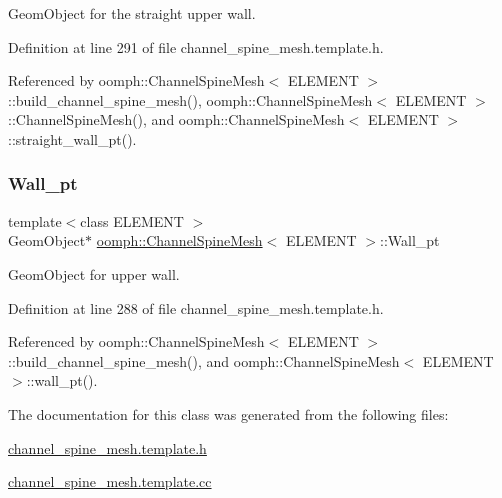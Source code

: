 Geom\+Object for the straight upper wall. 



Definition at line 291 of file channel\+\_\+spine\+\_\+mesh.\+template.\+h.



Referenced by oomph\+::\+Channel\+Spine\+Mesh$<$ E\+L\+E\+M\+E\+N\+T $>$\+::build\+\_\+channel\+\_\+spine\+\_\+mesh(), oomph\+::\+Channel\+Spine\+Mesh$<$ E\+L\+E\+M\+E\+N\+T $>$\+::\+Channel\+Spine\+Mesh(), and oomph\+::\+Channel\+Spine\+Mesh$<$ E\+L\+E\+M\+E\+N\+T $>$\+::straight\+\_\+wall\+\_\+pt().

\mbox{\label{classoomph_1_1ChannelSpineMesh_adaa23badd05b69c905b444bd9141b3a7}} 
\subsubsection{\texorpdfstring{Wall\+\_\+pt}{Wall\_pt}}
{\footnotesize\ttfamily template$<$class E\+L\+E\+M\+E\+NT $>$ \\
Geom\+Object$\ast$ \hyperlink{classoomph_1_1ChannelSpineMesh}{oomph\+::\+Channel\+Spine\+Mesh}$<$ E\+L\+E\+M\+E\+NT $>$\+::Wall\+\_\+pt\hspace{0.3cm}{\ttfamily [protected]}}



Geom\+Object for upper wall. 



Definition at line 288 of file channel\+\_\+spine\+\_\+mesh.\+template.\+h.



Referenced by oomph\+::\+Channel\+Spine\+Mesh$<$ E\+L\+E\+M\+E\+N\+T $>$\+::build\+\_\+channel\+\_\+spine\+\_\+mesh(), and oomph\+::\+Channel\+Spine\+Mesh$<$ E\+L\+E\+M\+E\+N\+T $>$\+::wall\+\_\+pt().



The documentation for this class was generated from the following files\+:\begin{DoxyCompactItemize}
\item 
\hyperlink{channel__spine__mesh_8template_8h}{channel\+\_\+spine\+\_\+mesh.\+template.\+h}\item 
\hyperlink{channel__spine__mesh_8template_8cc}{channel\+\_\+spine\+\_\+mesh.\+template.\+cc}\end{DoxyCompactItemize}
